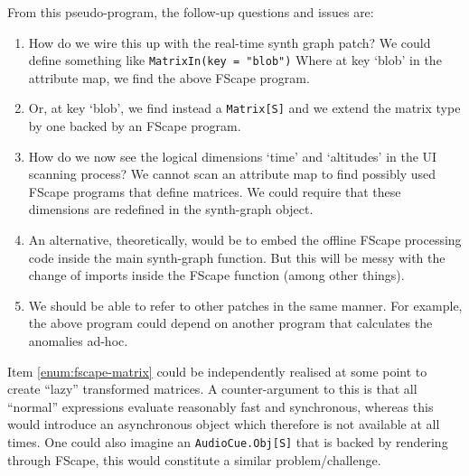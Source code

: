 \documentclass[11pt,a4paper]{article}
\begin{document}
From this pseudo-program, the follow-up questions and issues are:
%
\begin{enumerate}
\item How do we wire this up with the real-time synth graph patch? We could define something like \Verb!MatrixIn(key = "blob")! Where at key `blob' in the attribute map, we find the above FScape program.
\item \label{enum:fscape-matrix} Or, at key `blob', we find instead a \Verb!Matrix[S]! and we extend the matrix type by one backed by an FScape program.
\item How do we now see the logical dimensions `time' and `altitudes' in the UI scanning process? We cannot scan an attribute map to find possibly used FScape programs that define matrices. We could require that these dimensions are redefined in the synth-graph object.
\item An alternative, theoretically, would be to embed the offline FScape processing code inside the main synth-graph function. But this will be messy with the change of imports inside the FScape function (among other things).
\item We should be able to refer to other patches in the same manner. For example, the above program could depend on another program that calculates the anomalies ad-hoc.
\end{enumerate}
%
Item \ref{enum:fscape-matrix} could be independently realised at some point to create ``lazy'' transformed matrices. A counter-argument to this is that all ``normal'' expressions evaluate reasonably fast and synchronous, whereas this would introduce an asynchronous object which therefore is not available at all times. One could also imagine an \Verb!AudioCue.Obj[S]! that is backed by rendering through FScape, this would constitute a similar problem/challenge.
\end{document}
